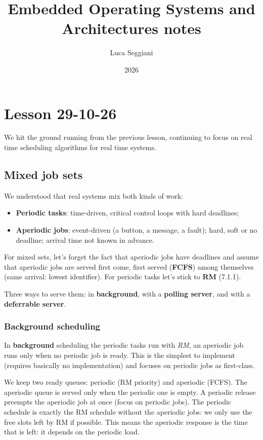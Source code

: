 \documentclass[a4paper,11pt]{article}
\title{Embedded Operating Systems and Architectures notes}
\author{Luca Seggiani}
\date{2026}
\begin{document}
\section{Lesson 29-10-26}

\thispagestyle{empty}
\pagestyle{fancy}

We hit the ground running from the previous lesson, continuing to focus on real time scheduling algorithms for real time systems.

\subsection{Mixed job sets}

We understood that real systems mix both kinds of work:
\begin{itemize}
	\item \textbf{Periodic tasks}: time-driven, critical control loops with hard deadlines;
	\item \textbf{Aperiodic jobs}: event-driven (a button, a message, a fault); hard, soft or no deadline; arrival time not known in advance.
\end{itemize}

For mixed sets, let's forget the fact that aperiodic jobs have deadlines and assume that aperiodic jobs are served first come, first served (\textbf{FCFS}) among themselves (same arrival: lowest identifier).
For periodic tasks let's stick to \textbf{RM} (7.1.1).

Three ways to serve them: in \textbf{background}, with a \textbf{polling server}, and with a \textbf{deferrable server}.

\subsubsection{Background scheduling}

In \textbf{background} scheduling the periodic tasks run with \textit{RM}, an aperiodic job runs only when no periodic job is ready.
This is the simplest to implement (requires basically no implementation) and focuses on periodic jobs as first-class.

We keep two ready queues: periodic (RM priority) and aperiodic (FCFS). The aperiodic queue is served only when the periodic one is empty.
A periodic release preempts the aperiodic job at once (focus on periodic jobs).
The periodic schedule is exactly the RM schedule without the aperiodic jobs: we only use the free slots left by RM if possible.
This means the aperiodic response is the time that is left: it depends on the periodic load.
\end{document}

